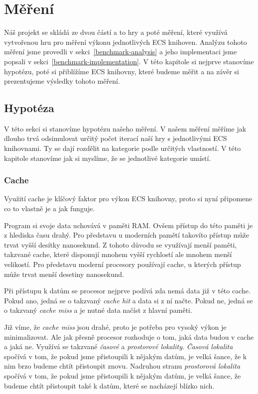 \chapter{Měření}
\label{chap:benchmark}
Náš projekt se skládá ze dvou částí a to hry a poté měření, které využívá vytvořenou hru pro měření výkonu jednotlivých ECS knihoven. Analýzu tohoto měření jsme provedli v sekci~\ref{benchmark-analysis} a jeho implementaci jsme popsali v sekci~\ref{benchmark-implementation}. V této kapitole si nejprve stanovíme hypotézu, poté si přiblížíme ECS knihovny, které budeme měřit a na závěr si prezentujeme výsledky tohoto měření.

\section{Hypotéza}
\label{chap:hypothesis}
V této sekci si stanovíme hypotézu našeho měření. V našem měření měříme jak dlouho trvá odsimulovat určitý počet iterací naší hry s jednotlivými ECS knihovnami. Ty se dají rozdělit na kategorie podle určitých vlastností. V této kapitole stanovíme jak si myslíme, že se jednotlivé kategorie umístí.


\subsection{Cache}
Využití cache je klíčový faktor pro výkon ECS knihovny, proto si nyní připomene co to vlastně je a jak funguje.

Program si svoje data uchovává v paměti RAM. Ovšem přístup do této paměti je z hlediska času drahý. Pro představu u moderních pamětí takovíto přístup může trvat vyšší desítky nanosekund. Z tohoto důvodu se využívají menší paměti, takzvané cache, které disponují mnohem vyšší rychlostí ale mnohem menší velikostí. Pro představu moderní procesory používají cache, u kterých přístup může trvat menší desetiny nanosekund.

Při přístupu k datům se procesor nejprve podívá zda nemá data již v této cache. Pokud ano, jedná se o takzvaný \textit{cache hit} a data si z ní načte. Pokud ne, jedná se o takzvaný \textit{cache miss} a je nutné data načíst z hlavní paměti. 

Již víme, že \textit{cache miss} jsou drahé, proto je potřeba pro vysoký výkon je minimalizovat. Ale jak přesně procesor rozhoduje o tom, jaká data budou v cache a jaká ne. Využívá se takzvané \textit{časové} a \textit{prostorové lokality}. \textit{Časová lokalita} spočívá v tom, že pokud jsme přistoupili k nějakým datům, je velká šance, že k nim brzo budeme chtít přistoupit znovu. Nadruhou stranu \textit{prostorová lokalita} spočívá v tom, že pokud jsme přistoupili k nějakým datům, je velká šance, že budeme chtít přistoupit také k datům, které se nacházejí blízko nich.

